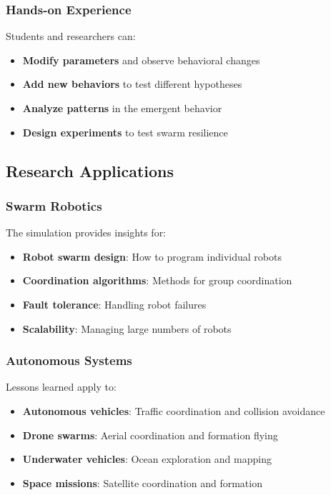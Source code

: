 \documentclass[12pt,a4paper]{article}
\begin{document}
\subsubsection{Hands-on Experience}
Students and researchers can:

\begin{itemize}
    \item \textbf{Modify parameters} and observe behavioral changes
    \item \textbf{Add new behaviors} to test different hypotheses
    \item \textbf{Analyze patterns} in the emergent behavior
    \item \textbf{Design experiments} to test swarm resilience
\end{itemize}

\subsection{Research Applications}

\subsubsection{Swarm Robotics}
The simulation provides insights for:

\begin{itemize}
    \item \textbf{Robot swarm design}: How to program individual robots
    \item \textbf{Coordination algorithms}: Methods for group coordination
    \item \textbf{Fault tolerance}: Handling robot failures
    \item \textbf{Scalability}: Managing large numbers of robots
\end{itemize}

\subsubsection{Autonomous Systems}
Lessons learned apply to:

\begin{itemize}
    \item \textbf{Autonomous vehicles}: Traffic coordination and collision avoidance
    \item \textbf{Drone swarms}: Aerial coordination and formation flying
    \item \textbf{Underwater vehicles}: Ocean exploration and mapping
    \item \textbf{Space missions}: Satellite coordination and formation
\end{itemize}
\end{document}
